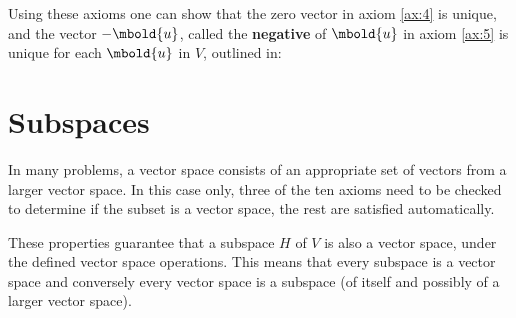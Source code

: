 \documentclass[12pt letter]{report}
\begin{document}
Using these axioms one can show that the zero vector in axiom \ref{ax:4} is unique, and the vector $-\mbold{u}$, called
the \textbf{negative} of $\mbold{u}$ in axiom \ref{ax:5} is unique for each $\mbold{u}$ in $V$, outlined in:


\section{Subspaces}

In many problems, a vector space consists of an appropriate set of vectors from a larger vector space. In this case
only, three of the ten axioms need to be checked to determine if the subset is a vector space, the rest are satisfied
automatically.


These properties guarantee that a subspace $H$ of $V$ is also a vector space, under the defined vector space operations.
This means that every subspace is a vector space and conversely every vector space is a subspace (of itself and possibly
of a larger vector space).
\end{document}
